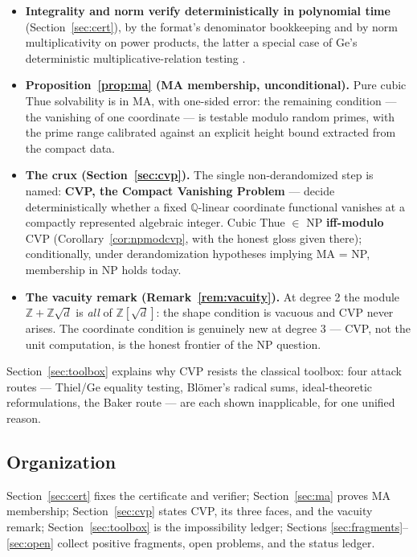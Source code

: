 \documentclass[11pt]{amsart}
\theoremstyle{plain}
\theoremstyle{remark}
\begin{document}
\begin{itemize}
\item \textbf{Integrality and norm verify deterministically in
  polynomial time} (Section~\ref{sec:cert}), by the format's
  denominator bookkeeping and by norm multiplicativity on power
  products, the latter a special case of Ge's deterministic
  multiplicative-relation testing \cite{Ge93}.
\item \textbf{Proposition~\ref{prop:ma} (MA membership,
  unconditional).} Pure cubic Thue solvability is in MA, with
  one-sided error: the remaining condition --- the vanishing of one
  coordinate --- is testable modulo random primes, with the prime
  range calibrated against an explicit height bound extracted from
  the compact data.
\item \textbf{The crux (Section~\ref{sec:cvp}).} The single
  non-derandomized step is named: \textbf{CVP, the Compact Vanishing
  Problem} --- decide deterministically whether a fixed
  $\mathbb{Q}$-linear coordinate functional vanishes at a compactly
  represented algebraic integer. Cubic Thue $\in$ NP
  \textbf{iff-modulo} CVP (Corollary~\ref{cor:npmodcvp}, with the
  honest gloss given there); conditionally, under derandomization
  hypotheses implying MA = NP, membership in NP holds today.
\item \textbf{The vacuity remark (Remark~\ref{rem:vacuity}).} At
  degree 2 the module $\mathbb{Z} + \mathbb{Z}\sqrt{d}$ is \emph{all}
  of $\mathbb{Z}[\sqrt{d}]$: the shape condition is vacuous and CVP
  never arises. The coordinate condition is genuinely new at degree 3
  --- CVP, not the unit computation, is the honest frontier of the NP
  question.
\end{itemize}

Section~\ref{sec:toolbox} explains why CVP resists the classical
toolbox: four attack routes --- Thiel/Ge equality testing,
Bl\"omer's radical sums, ideal-theoretic reformulations, the Baker
route --- are each shown inapplicable, for one unified reason.

\subsection{Organization}\label{sec:org}

Section~\ref{sec:cert} fixes the certificate and verifier;
Section~\ref{sec:ma} proves MA membership; Section~\ref{sec:cvp}
states CVP, its three faces, and the vacuity remark;
Section~\ref{sec:toolbox} is the impossibility ledger;
Sections \ref{sec:fragments}--\ref{sec:open} collect positive
fragments, open problems, and the status ledger.
\end{document}
